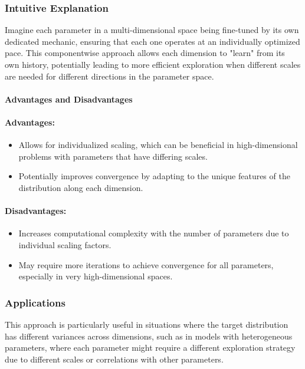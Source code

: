 \documentclass{article}
\begin{document}
\subsubsection{Intuitive Explanation}
Imagine each parameter in a multi-dimensional space being fine-tuned by its own dedicated mechanic, ensuring that each one operates at an individually optimized pace. This componentwise approach allows each dimension to "learn" from its own history, potentially leading to more efficient exploration when different scales are needed for different directions in the parameter space.

\paragraph{Advantages and Disadvantages}
\paragraph{Advantages:}
\begin{itemize}
    \item Allows for individualized scaling, which can be beneficial in high-dimensional problems with parameters that have differing scales.
    \item Potentially improves convergence by adapting to the unique features of the distribution along each dimension.
\end{itemize}

\paragraph{Disadvantages:}
\begin{itemize}
    \item Increases computational complexity with the number of parameters due to individual scaling factors.
    \item May require more iterations to achieve convergence for all parameters, especially in very high-dimensional spaces.
\end{itemize}

\subsubsection{Applications}
This approach is particularly useful in situations where the target distribution has different variances across dimensions, such as in models with heterogeneous parameters, where each parameter might require a different exploration strategy due to different scales or correlations with other parameters.
\end{document}
